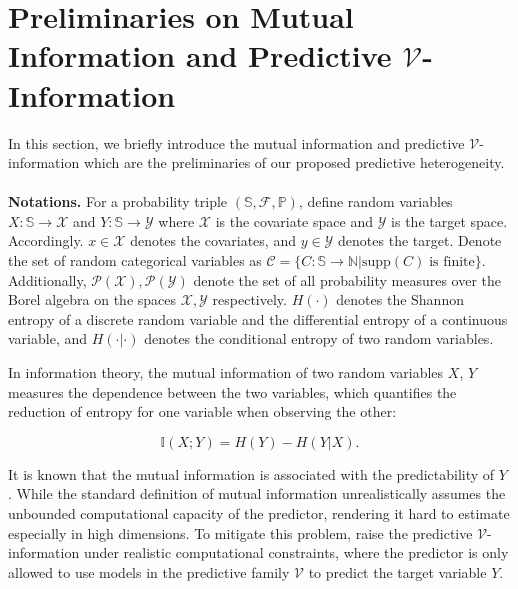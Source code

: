 \section{Preliminaries on Mutual Information and Predictive $\mathcal V$-Information}
In this section, we briefly introduce the mutual information and predictive $\mathcal V$-information \citep{DBLP:conf/iclr/XuZSSE20} which are the preliminaries of our proposed predictive heterogeneity.\\\\
\textbf{Notations.} For a probability triple $(\mathbb S,  \mathcal F, \mathbb P)$, define random variables $X: \mathbb S\rightarrow \mathcal X$ and $Y: \mathbb S\rightarrow \mathcal Y$ where $\mathcal X$ is the covariate space and $\mathcal Y$ is the target space. Accordingly. $x \in \mathcal X$ denotes the covariates, and $y\in\mathcal{Y}$ denotes the target. Denote the set of random categorical variables as $\mathcal C = \{ C: \mathbb S \rightarrow \mathbb N| \text{supp}(C) \;\text{is finite} \}$. Additionally, $\mathcal{P}(\mathcal{X}), \mathcal{P}(\mathcal Y)$ denote the set of all probability measures over the Borel algebra on the spaces $\mathcal{X}, \mathcal{Y}$ respectively. 
$H(\cdot)$ denotes the Shannon entropy of a discrete random variable and the differential entropy of a continuous variable, and $H(\cdot|\cdot)$ denotes the conditional entropy of two random variables.




In information theory, the mutual information of two random variables $X$, $Y$ measures the dependence between the two variables, which quantifies the reduction of entropy for one variable when observing the other:
\begin{small}
\begin{equation}
	\mathbb{I}(X;Y) = H(Y) - H(Y|X).
\end{equation}	
\end{small}
It is known that the mutual information is associated with the predictability of $Y$ \citep{cover1991infomationtheory}. While the standard definition of mutual information unrealistically assumes the unbounded computational capacity of the predictor, rendering it hard to estimate especially in high dimensions.
To mitigate this problem, \cite{DBLP:conf/iclr/XuZSSE20} raise the predictive $\mathcal V$-information under realistic computational constraints, where the predictor is only allowed to use models in the predictive family $\mathcal V$ to predict the target variable $Y$.

